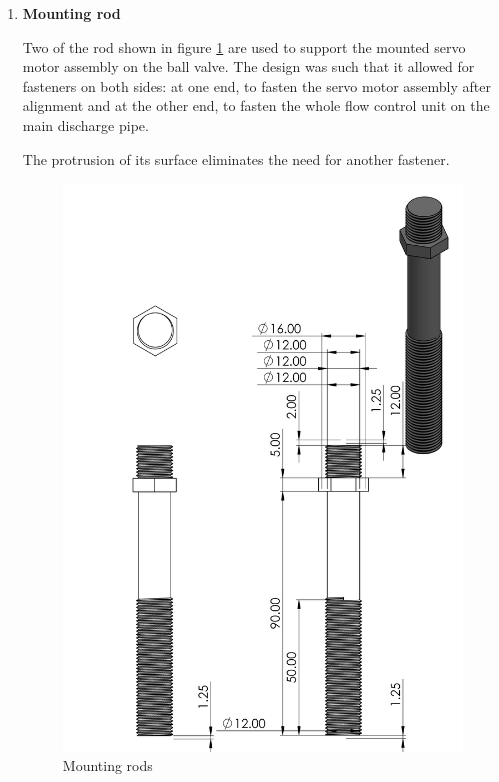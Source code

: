 \begin{enumerate}
\begin{enumerate}
     \item \textbf{Mounting rod}
     \par
     Two of the rod shown in figure \ref{fig:mounting_rods} are used to support the mounted servo motor assembly on the ball valve. The design was such that it allowed for fasteners on both sides: at one end, to fasten the servo motor assembly after alignment and at the other end, to fasten the whole flow control unit on the main discharge pipe.
     \par
     The protrusion of its surface eliminates the need for another fastener. 
      \begin{figure}[H]
          \centering
          \includegraphics[height=.75\textheight]{Figures/ServoMotorMountRods.PNG}
          \caption{Mounting rods}
          \label{fig:mounting_rods}
      \end{figure}
      \par

\end{enumerate}
\end{enumerate}
